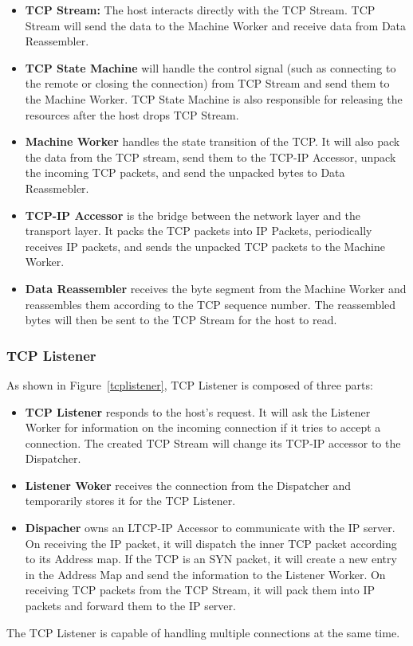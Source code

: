 \begin{itemize}
  \item \textbf{TCP Stream:} The host interacts directly with the TCP Stream. TCP Stream will send the data to the Machine Worker and receive data from Data Reassembler.
  \item \textbf{TCP State Machine} will handle the control signal (such as connecting to the remote or closing the connection) from TCP Stream and send them to the Machine Worker. TCP State Machine is also responsible for releasing the resources after the host drops TCP Stream.
  \item \textbf{Machine Worker} handles the state transition of the TCP. It will also pack the data from the TCP stream, send them to the TCP-IP Accessor, unpack the incoming TCP packets, and send the unpacked bytes to Data Reassmebler.
  \item \textbf{TCP-IP Accessor} is the bridge between the network layer and the transport layer. It packs the TCP packets into IP Packets, periodically receives IP packets, and sends the unpacked TCP packets to the Machine Worker.
  \item \textbf{ Data Reassembler} receives the byte segment from the Machine Worker and reassembles them according to the TCP sequence number. The reassembled bytes will then be sent to the TCP Stream for the host to read.
\end{itemize}
\subsubsection{TCP Listener}

As shown in Figure~\ref{tcplistener}, TCP Listener is composed of three parts:
\begin{itemize}
  \item \textbf{TCP Listener} responds to the host's request. It will ask the Listener Worker for information on the incoming connection if it tries to accept a connection. The created TCP Stream will change its TCP-IP accessor to the Dispatcher.
  \item \textbf{Listener Woker} receives the connection from the Dispatcher and temporarily stores it for the TCP Listener.
  \item \textbf{Dispacher} owns an LTCP-IP Accessor to communicate with the IP server. On receiving the IP packet, it will dispatch the inner TCP packet according to its Address map. If the TCP is an SYN packet, it will create a new entry in the Address Map and send the information to the Listener Worker. On receiving TCP packets from the TCP Stream, it will pack them into IP packets and forward them to the IP server.
\end{itemize}
The TCP Listener is capable of handling multiple connections at the same time.